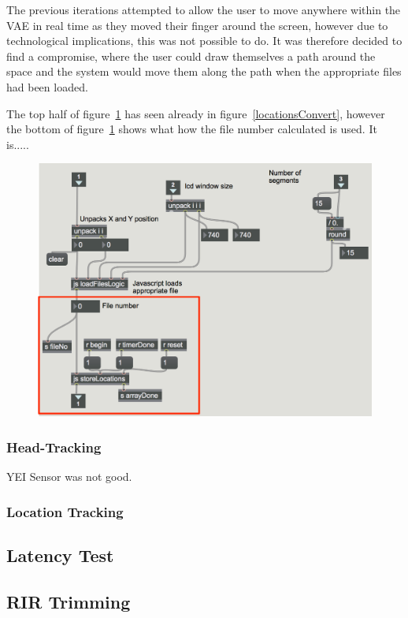 \documentclass[../../main.tex]{subfiles}
\begin{document}
		 	The previous iterations attempted to allow the user to move anywhere within the \ac{VAE} in real time as they moved their finger around the screen, however due to technological implications, this was not possible to do. It was therefore decided to find a compromise, where the user could draw themselves a path around the space and the system would move them along the path when the appropriate files had been loaded.

		 	The top half of figure~\ref{storeLocations} has seen already in figure~\ref{locationsConvert}, however the bottom of figure~\ref{storeLocations} shows what how the file number calculated is used. It is.....

			\begin{figure}[H]
				\centerline{\includegraphics[scale = 0.4]{Sections/Implementation/Max/images/Max/Iteration3/storeLocations_edit.png}}
				\caption{}
				\label{storeLocations}
			\end{figure}


	\subsubsection{Head-Tracking}
		YEI Sensor was not good.

	\subsubsection{Location Tracking}
	\label{locationtracking}


	\subsection{Latency Test}
	
	\subsection{RIR Trimming}
\end{document}
